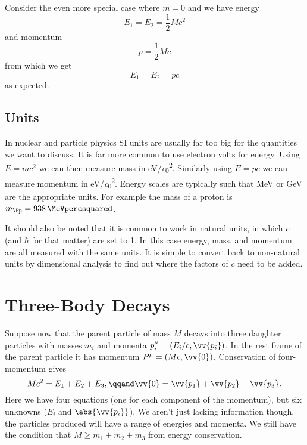\documentclass[fleqn]{NotesClass}
\begin{document}
    Consider the even more special case where \(m = 0\) and we have energy
    \begin{equation}
        E_1 = E_2 = \frac{1}{2}Mc^2
    \end{equation}
    and momentum
    \begin{equation}
        p = \frac{1}{2}Mc
    \end{equation}
    from which we get
    \begin{equation}
        E_1 = E_2 = pc
    \end{equation}
    as expected.
    
    \subsection{Units}
    In nuclear and particle physics SI units are usually far too big for the quantities we want to discuss.
    It is far more common to use electron volts for energy.
    Using \(E = mc^2\) we can then measure mass in \unit[per-mode=symbol]{\electronvolt\per\clight\squared}.
    Similarly using \(E = pc\) we can measure momentum in \unit[per-mode=symbol]{\electronvolt\per\clight\squared}.
    Energy scales are typically such that \unit{\MeV} or \unit{\giga\electronvolt} are the appropriate units.
    For example the mass of a proton is \(m_{\Pp} = \qty{938}{\MeVpercsquared}\).
    
    It should also be noted that it is common to work in natural units, in which \(c\) (and \(\hbar\) for that matter) are set to 1.
    In this case energy, mass, and momentum are all measured with the same units.
    It is simple to convert back to non-natural units by dimensional analysis to find out where the factors of \(c\) need to be added.
    
    \section{Three-Body Decays}
    Suppose now that the parent particle of mass \(M\) decays into three daughter particles with masses \(m_i\) and momenta \(p_i^\mu = (E_i/c, \vv{p_i})\).
    In the rest frame of the parent particle it has momentum \(P^\mu = (Mc, \vv{0})\).
    Conservation of four-momentum gives
    \begin{equation}
        Mc^2 = E_1 + E_2 + E_3, \qqand \vv{0} = \vv{p_1} + \vv{p_2} + \vv{p_3}.
    \end{equation}
    Here we have four equations (one for each component of the momentum), but six unknowns (\(E_i\) and \(\abs{\vv{p_i}}\)).
    We aren't just lacking information though, the particles produced will have a range of energies and momenta.
    We still have the condition that \(M \ge m_1 + m_2 + m_3\) from energy conservation.
    
\end{document}
